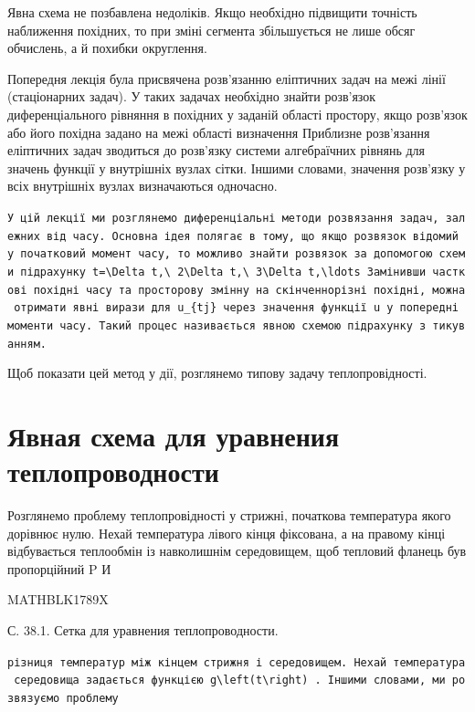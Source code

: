 \documentclass[
  ukrainian,
]{article}
\begin{document}
Явна схема не позбавлена недоліків. Якщо необхідно підвищити точність
наближення похідних, то при зміні сегмента збільшується не лише обсяг
обчислень, а й похибки округлення.

Попередня лекція була присвячена розв'язанню еліптичних задач на межі
лінії (стаціонарних задач). У таких задачах необхідно знайти розв'язок
диференціального рівняння в похідних у заданій області простору, якщо
розв'язок або його похідна задано на межі області визначення Приблизне
розв'язання еліптичних задач зводиться до розв'язку системи алгебраїчних
рівнянь для значень функції у внутрішніх вузлах сітки. Іншими словами,
значення розв'язку у всіх внутрішніх вузлах визначаються одночасно.

\texttt{У\ цій\ лекції\ ми\ розглянемо\ диференціальні\ методи\ розв\textquotesingle{}язання\ задач,\ залежних\ від\ часу.\ Основна\ ідея\ полягає\ в\ тому,\ що\ якщо\ розв\textquotesingle{}язок\ відомий\ у\ початковий\ момент\ часу,\ то\ можливо\ знайти\ розв\textquotesingle{}язок\ за\ допомогою\ схеми\ підрахунку\ \textquotesingle{}t=\textbackslash{}Delta\ t,\textbackslash{}\ 2\textbackslash{}Delta\ t,\textbackslash{}\ 3\textbackslash{}Delta\ t,\textbackslash{}ldots\textquotesingle{}\ Замінивши\ часткові\ похідні\ часу\ та\ просторову\ змінну\ на\ скінченнорізні\ похідні,\ можна\ отримати\ явні\ вирази\ для\ \textquotesingle{}u\_\{tj\}\textquotesingle{}\ через\ значення\ функції\ u\ у\ попередні\ моменти\ часу.\ Такий\ процес\ називається\ явною\ схемою\ підрахунку\ з\ тикуванням.}

Щоб показати цей метод у дії, розглянемо типову задачу теплопровідності.

\section{Явная схема для уравнения
теплопроводности}\label{ux44fux432ux43dux430ux44f-ux441ux445ux435ux43cux430-ux434ux43bux44f-ux443ux440ux430ux432ux43dux435ux43dux438ux44f-ux442ux435ux43fux43bux43eux43fux440ux43eux432ux43eux434ux43dux43eux441ux442ux438}

Розглянемо проблему теплопровідності у стрижні, початкова температура
якого дорівнює нулю. Нехай температура лівого кінця фіксована, а на
правому кінці відбувається теплообмін із навколишнім середовищем, щоб
тепловий фланець був пропорційний P И

MATHBLK1789X

С. 38.1. Сетка для уравнения теплопроводности.

\texttt{різниця\ температур\ між\ кінцем\ стрижня\ і\ середовищем.\ Нехай\ температура\ середовища\ задається\ функцією\ \textquotesingle{}g\textbackslash{}left(t\textbackslash{}right)\textquotesingle{}\ .\ Іншими\ словами,\ ми\ розв\textquotesingle{}язуємо\ проблему}
\end{document}
